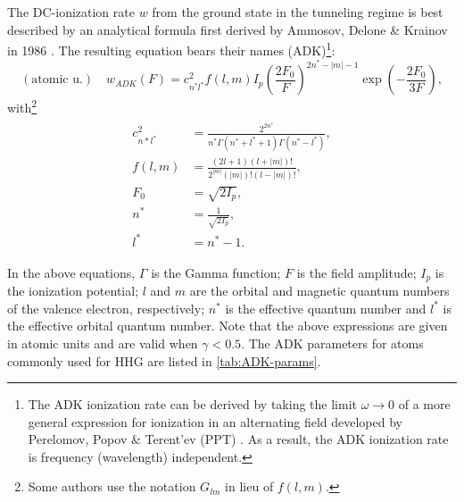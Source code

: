 The DC-ionization rate $w$ from the ground state in the tunneling regime is best described by an analytical formula first derived by Ammosov, Delone \& Krainov in 1986 \cite{ammosovTunnelIonizationComplex1986,changFundamentalsAttosecondOptics2011,laiExperimentalInvestigationStrongfieldionization2017}. The resulting equation bears their names (ADK)\footnote{The ADK ionization rate can be derived by taking the limit $\omega \rightarrow 0$ of a more general expression for ionization in an alternating field developed by Perelomov, Popov \& Terent'ev (PPT) \cite{perelomovIONIZATIONATOMSALTERNATING1966}. As a result, the ADK ionization rate is frequency (wavelength) independent.}:
\begin{equation}
(\textrm{atomic u.}) \quad w_{ADK}(F) = c^2_{n^*l^*} f(l,m) I_p \left( \frac{2F_0}{F} \right)^{2n^*-|m|-1} \exp \left( - \frac{2 F_0}{3F} \right),
\label{eqn:ADK-rate}
\end{equation}
with\footnote{Some authors use the notation $G_{lm}$ in lieu of $f(l,m)$.}
\begin{align}
\begin{split}
c_{n*l^*}^2 &= \frac{2^{2n^*}}{n^* \Gamma(n^* + l^* + 1) \Gamma(n^* - l^*)},  \\
f(l,m) &= \frac{(2l+1)(l+|m|)!}{2^{|m|} (|m|)! (l-|m|)!}, \\
F_0 &= \sqrt{2 I_p}, \\
n^* &= \frac{1}{\sqrt{2I_p}}, \\
l^* &= n^* - 1.
\end{split}
\end{align}

In the above equations, $\Gamma$ is the Gamma function; $F$ is the field amplitude; $I_p$ is the ionization potential; $l$ and $m$ are the orbital and magnetic quantum numbers of the valence electron, respectively; $n^*$ is the effective quantum number and $l^*$ is the effective orbital quantum number. Note that the above expressions are given in atomic units and are valid when $\gamma < 0.5$. The ADK parameters for atoms commonly used for HHG are listed in \cref{tab:ADK-params}.

